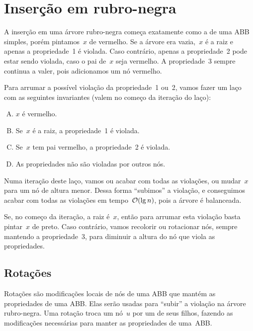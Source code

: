 \documentclass[main.tex]{subfiles}
\begin{document}
\section{Inserção em rubro-negra}

A inserção em uma árvore rubro-negra começa exatamente como a de uma ABB simples, porém pintamos~$x$ de vermelho.
Se a árvore era vazia,~$x$ é a raiz e apenas a propriedade~1 é violada. Caso contrário, apenas a propriedade~2 pode estar sendo violada, caso o pai de~$x$ seja vermelho. A propriedade~3 sempre continua a valer, pois adicionamos um nó vermelho.

Para arrumar a possível violação da propriedade~1 ou~2, vamos fazer um laço com as seguintes invariantes (valem no começo da iteração do laço):
\begin{enumerate}[(A)]
\item $x$ é vermelho.
\item Se~$x$ é a raiz, a propriedade~1 é violada.
\item Se~$x$ tem pai vermelho, a propriedade~2 é violada.
\item As propriedades não são violadas por outros nós.
\end{enumerate}

Numa iteração deste laço, vamos ou acabar com todas as violações, ou mudar~$x$ para um nó de altura menor. Dessa forma ``subimos'' a violação, e conseguimos acabar com todas as violações em tempo~$\mathcal{O}(\lg n)$, pois a árvore é balanceada.

Se, no começo da iteração, a raiz é~$x$, então para arrumar esta violação basta pintar~$x$ de preto. Caso contrário, vamos recolorir ou rotacionar nós, sempre mantendo a propriedade~3, para diminuir a altura do nó que viola as propriedades.

\subsection{Rotações}

Rotações são modificações locais de nós de uma ABB que mantém as propriedades de uma ABB. Elas serão usadas para ``subir'' a violação na árvore rubro-negra. Uma rotação troca um nó~$u$ por um de seus filhos, fazendo as modificações necessárias para manter as propriedades de uma~ABB.
\end{document}

